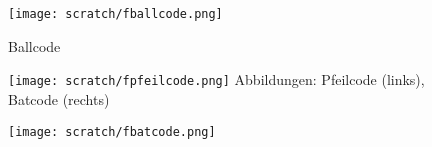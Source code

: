 \documentclass[10pt,a4paper,ngerman,twoside]{article} %
\newcommand{\SepRule}{\noindent	%
\begin{center}
\rule{250pt}{1pt} %
\end{center}
}
\begin{document}
%
\begin{figure}
\texttt{[image: scratch/fballcode.png]}\\
\caption{Ballcode}
\end{figure}

\begin{minipage}{0.35\linewidth}  
\begin{figure}
\texttt{[image: scratch/fpfeilcode.png]}
Abbildungen: Pfeilcode (links), Batcode (rechts)
\end{figure}
\end{minipage}
\begin{minipage}{0.6\linewidth}
\begin{figure}
\texttt{[image: scratch/fbatcode.png]}
\end{figure}    
\end{minipage}
\end{document}
